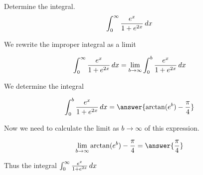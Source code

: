 \documentclass{ximera}
\author{Jason Miller}
\begin{document}
\begin{exercise}
Determine the integral.
\[
\int_{0}^{\infty} \frac{e^{x}}{1+e^{2x}} \mathop{}\!d x
\]

We  rewrite the improper integral as a limit

\[
\int_{0}^{\infty}\frac{e^{x}}{1+e^{2x}} \mathop{}\!d x=\lim_{b \to \infty} \int_{0}^{b} \frac{e^{x}}{1+e^{2x}} \mathop{}\!d x
\]

We determine the integral

\[
\int_{0}^{b} \frac{e^{x}}{1+e^{2x}} \d x= \answer{\arctan(e^{b}) - \frac{\pi}{4} }
\]


\begin{exercise}
Now we need to calculate the limit as $b \to \infty$ of this expression. 

\[
\lim_{b \to \infty} \arctan(e^{b})-\frac{\pi}{4} =\answer{ \frac{\pi}{4}}
\]

\begin{exercise}
Thus the integral $\int_{0}^{\infty} \frac{e^{x}}{1+e^{2x}} \mathop{}\!d x$

\begin{multipleChoice}
\end{multipleChoice}




\end{exercise}
\end{exercise}
\end{exercise}
\end{document}
